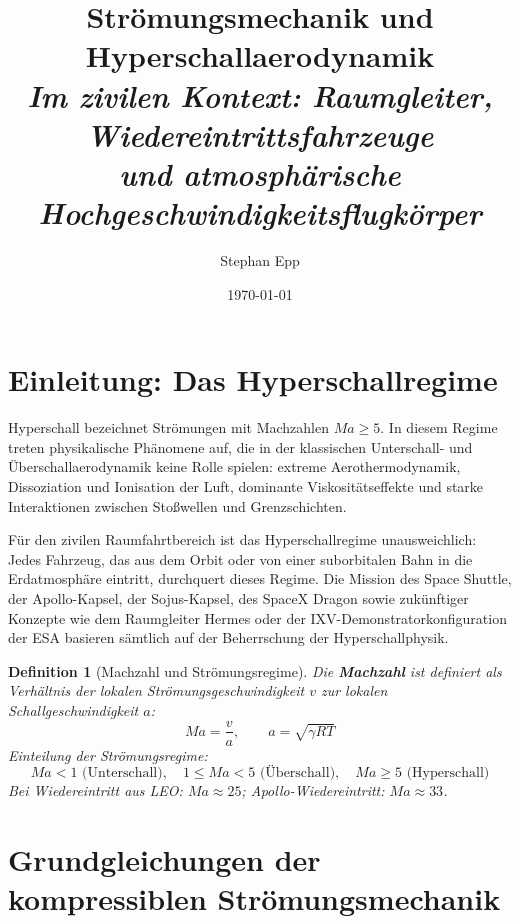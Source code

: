 ﻿\documentclass[12pt,a4paper]{article}
\title{Strömungsmechanik und Hyperschallaerodynamik\\[0.4em]
  \large\textit{Im zivilen Kontext: Raumgleiter, Wiedereintrittsfahrzeuge\\
und atmosph\"{a}rische Hochgeschwindigkeitsflugk\"{o}rper}}
\author{Stephan Epp}
\date{\today}
\newtheorem{definition}{Definition}[section]
\newcommand{\Ma}{M\!a}
\begin{document}

\maketitle

\tableofcontents
\newpage

\section{Einleitung: Das Hyperschallregime}

Hyperschall bezeichnet Strömungen mit Machzahlen $\Ma \geq 5$. In diesem Regime
treten physikalische Phänomene auf, die in der klassischen Unterschall- und
Überschallaerodynamik keine Rolle spielen: extreme Aerothermodynamik,
Dissoziation und Ionisation der Luft, dominante Viskositätseffekte und starke
Interaktionen zwischen Stoßwellen und Grenzschichten.

Für den zivilen Raumfahrtbereich ist das Hyperschallregime unausweichlich: Jedes
Fahrzeug, das aus dem Orbit oder von einer suborbitalen Bahn in die Erdatmosphäre
eintritt, durchquert dieses Regime. Die Mission des Space Shuttle, der Apollo-Kapsel,
der Sojus-Kapsel, des SpaceX Dragon sowie zukünftiger Konzepte wie dem Raumgleiter
Hermes oder der IXV-Demonstratorkonfiguration der ESA basieren sämtlich auf der
Beherrschung der Hyperschallphysik.

\begin{definition}[Machzahl und Strömungsregime]
Die \textbf{Machzahl} ist definiert als Verhältnis der lokalen Strömungsgeschwindigkeit
$v$ zur lokalen Schallgeschwindigkeit $a$:
\[
  \Ma = \frac{v}{a}, \qquad a = \sqrt{\gamma R T}
\]
Einteilung der Strömungsregime:
\[
  \Ma < 1 \text{ (Unterschall)},\quad
  1 \leq \Ma < 5 \text{ (Überschall)},\quad
  \Ma \geq 5 \text{ (Hyperschall)}
\]
Bei Wiedereintritt aus LEO: $\Ma \approx 25$; Apollo-Wiedereintritt: $\Ma \approx 33$.
\end{definition}

\section{Grundgleichungen der kompressiblen Strömungsmechanik}
\end{document}
